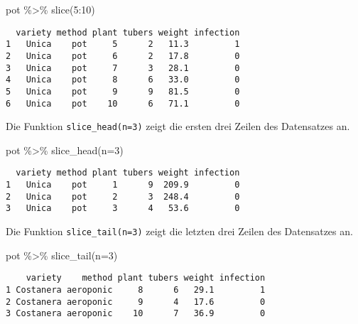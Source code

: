 \documentclass[
  letterpaper,
  DIV=11,
  numbers=noendperiod]{scrartcl}
\newenvironment{Shaded}{\begin{snugshade}}{\end{snugshade}}
\newcommand{\AttributeTok}[1]{\textcolor[rgb]{0.40,0.45,0.13}{#1}}
\newcommand{\DecValTok}[1]{\textcolor[rgb]{0.68,0.00,0.00}{#1}}
\newcommand{\FunctionTok}[1]{\textcolor[rgb]{0.28,0.35,0.67}{#1}}
\newcommand{\NormalTok}[1]{\textcolor[rgb]{0.00,0.23,0.31}{#1}}
\newcommand{\SpecialCharTok}[1]{\textcolor[rgb]{0.37,0.37,0.37}{#1}}
\begin{document}
\begin{Shaded}
\begin{Highlighting}[]
\NormalTok{pot }\SpecialCharTok{\%\textgreater{}\%} \FunctionTok{slice}\NormalTok{(}\DecValTok{5}\SpecialCharTok{:}\DecValTok{10}\NormalTok{)}
\end{Highlighting}
\end{Shaded}

\begin{verbatim}
  variety method plant tubers weight infection
1   Unica    pot     5      2   11.3         1
2   Unica    pot     6      2   17.8         0
3   Unica    pot     7      3   28.1         0
4   Unica    pot     8      6   33.0         0
5   Unica    pot     9      9   81.5         0
6   Unica    pot    10      6   71.1         0
\end{verbatim}

Die Funktion \texttt{slice\_head(n=3)} zeigt die ersten drei Zeilen des
Datensatzes an.

\begin{Shaded}
\begin{Highlighting}[]
\NormalTok{pot }\SpecialCharTok{\%\textgreater{}\%} \FunctionTok{slice\_head}\NormalTok{(}\AttributeTok{n=}\DecValTok{3}\NormalTok{)}
\end{Highlighting}
\end{Shaded}

\begin{verbatim}
  variety method plant tubers weight infection
1   Unica    pot     1      9  209.9         0
2   Unica    pot     2      3  248.4         0
3   Unica    pot     3      4   53.6         0
\end{verbatim}

Die Funktion \texttt{slice\_tail(n=3)} zeigt die letzten drei Zeilen des
Datensatzes an.

\begin{Shaded}
\begin{Highlighting}[]
\NormalTok{pot }\SpecialCharTok{\%\textgreater{}\%} \FunctionTok{slice\_tail}\NormalTok{(}\AttributeTok{n=}\DecValTok{3}\NormalTok{)}
\end{Highlighting}
\end{Shaded}

\begin{verbatim}
    variety    method plant tubers weight infection
1 Costanera aeroponic     8      6   29.1         1
2 Costanera aeroponic     9      4   17.6         0
3 Costanera aeroponic    10      7   36.9         0
\end{verbatim}
\end{document}
